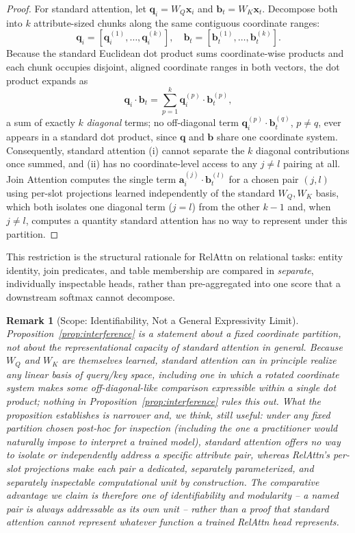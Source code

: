\documentclass[review]{elsarticle}
\newtheorem{remark}[theorem]{Remark}
\begin{document}
\begin{proof}
	\renewcommand{\qedsymbol}{}
For standard attention, let $\mathbf{q}_i = W_Q \mathbf{x}_i$ and $\mathbf{b}_t = W_K \mathbf{x}_t$. Decompose both into $k$ attribute-sized chunks along the same contiguous coordinate ranges:
\[
\mathbf{q}_i = [\mathbf{q}_i^{(1)}, \ldots, \mathbf{q}_i^{(k)}], \quad \mathbf{b}_t = [\mathbf{b}_t^{(1)}, \ldots, \mathbf{b}_t^{(k)}].
\]
Because the standard Euclidean dot product sums coordinate-wise products and each chunk occupies disjoint, aligned coordinate ranges in both vectors, the dot product expands as
\[
\mathbf{q}_i \cdot \mathbf{b}_t = \sum_{p=1}^{k} \mathbf{q}_i^{(p)} \cdot \mathbf{b}_t^{(p)},
\]
a sum of exactly $k$ \emph{diagonal} terms; no off-diagonal term $\mathbf{q}_i^{(p)} \cdot \mathbf{b}_t^{(q)}$, $p \neq q$, ever appears in a standard dot product, since $\mathbf{q}$ and $\mathbf{b}$ share one coordinate system. Consequently, standard attention (i) cannot separate the $k$ diagonal contributions once summed, and (ii) has no coordinate-level access to any $j \neq l$ pairing at all. Join Attention computes the single term $\mathbf{a}_i^{(j)} \cdot \mathbf{b}_t^{(l)}$ for a chosen pair $(j,l)$ using per-slot projections learned independently of the standard $W_Q, W_K$ basis, which both isolates one diagonal term ($j=l$) from the other $k-1$ and, when $j \neq l$, computes a quantity standard attention has no way to represent under this partition.
\end{proof}

This restriction is the structural rationale for RelAttn on relational tasks: entity identity, join predicates, and table membership are compared in \emph{separate}, individually inspectable heads, rather than pre-aggregated into one score that a downstream softmax cannot decompose.

\begin{remark}[Scope: Identifiability, Not a General Expressivity Limit]
\label{rem:expressivity_scope}
Proposition~\ref{prop:interference} is a statement about a \emph{fixed coordinate partition}, not about the representational capacity of standard attention in general. Because $W_Q$ and $W_K$ are themselves learned, standard attention can in principle realize any linear basis of query/key space, including one in which a rotated coordinate system makes some off-diagonal-like comparison expressible within a single dot product; nothing in Proposition~\ref{prop:interference} rules this out. What the proposition establishes is narrower and, we think, still useful: under \emph{any} fixed partition chosen post-hoc for inspection (including the one a practitioner would naturally impose to interpret a trained model), standard attention offers no way to isolate or independently address a specific attribute pair, whereas RelAttn's per-slot projections make each pair a dedicated, separately parameterized, and separately inspectable computational unit by construction. The comparative advantage we claim is therefore one of \emph{identifiability and modularity} -- a named pair is always addressable as its own unit -- rather than a proof that standard attention cannot represent whatever function a trained RelAttn head represents.
\end{remark}
\end{document}
